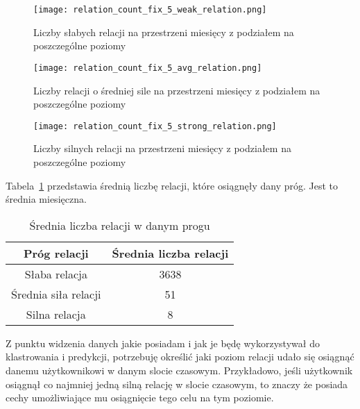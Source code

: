 \documentclass[polish,12pt]{aghthesis}
\begin{document}
\begin{figure}[ht]
    \centering
    \texttt{[image: relation\_count\_fix\_5\_weak\_relation.png]}
    \caption[Liczby słabych relacji]{Liczby słabych relacji na przestrzeni miesięcy z podziałem na poszczególne poziomy}
    \label{fig:weak_relation_count}
\end{figure}

\FloatBarrier

\begin{figure}[ht]
    \centering
    \texttt{[image: relation\_count\_fix\_5\_avg\_relation.png]}
    \caption[Liczby relacji o średniej sile]{Liczby relacji o średniej sile na przestrzeni miesięcy z podziałem na poszczególne poziomy}
    \label{fig:avg_relation_count}
\end{figure}

\FloatBarrier

\begin{figure}[ht]
    \centering
    \texttt{[image: relation\_count\_fix\_5\_strong\_relation.png]}
    \caption[Liczby silnych relacji]{Liczby silnych relacji na przestrzeni miesięcy z podziałem na poszczególne poziomy}
    \label{fig:strong_relation_count}
\end{figure}

\FloatBarrier

Tabela~\ref{tab:rel_count2} przedstawia średnią liczbę relacji, które osiągnęły dany próg. Jest to średnia miesięczna.

\begin{table}[h]
\centering
\begin{tabular}{|c|c|}
\hline
\textbf{Próg relacji} & \textbf{Średnia liczba relacji} \\
\hline
Słaba relacja & 3638 \\
\hline
Średnia siła relacji & 51 \\
\hline
Silna relacja & 8 \\
\hline
\end{tabular}
\caption{Średnia liczba relacji w danym progu}
\label{tab:rel_count2}
\end{table}

\FloatBarrier

Z punktu widzenia danych jakie posiadam i jak je będę wykorzystywał do klastrowania i predykcji, potrzebuję określić jaki poziom relacji udało się osiągnąć danemu użytkownikowi w danym slocie czasowym. Przykładowo, jeśli użytkownik osiągnął co najmniej jedną silną relację w slocie czasowym, to znaczy że posiada cechy umożliwiające mu osiągnięcie tego celu na tym poziomie.
\end{document}
